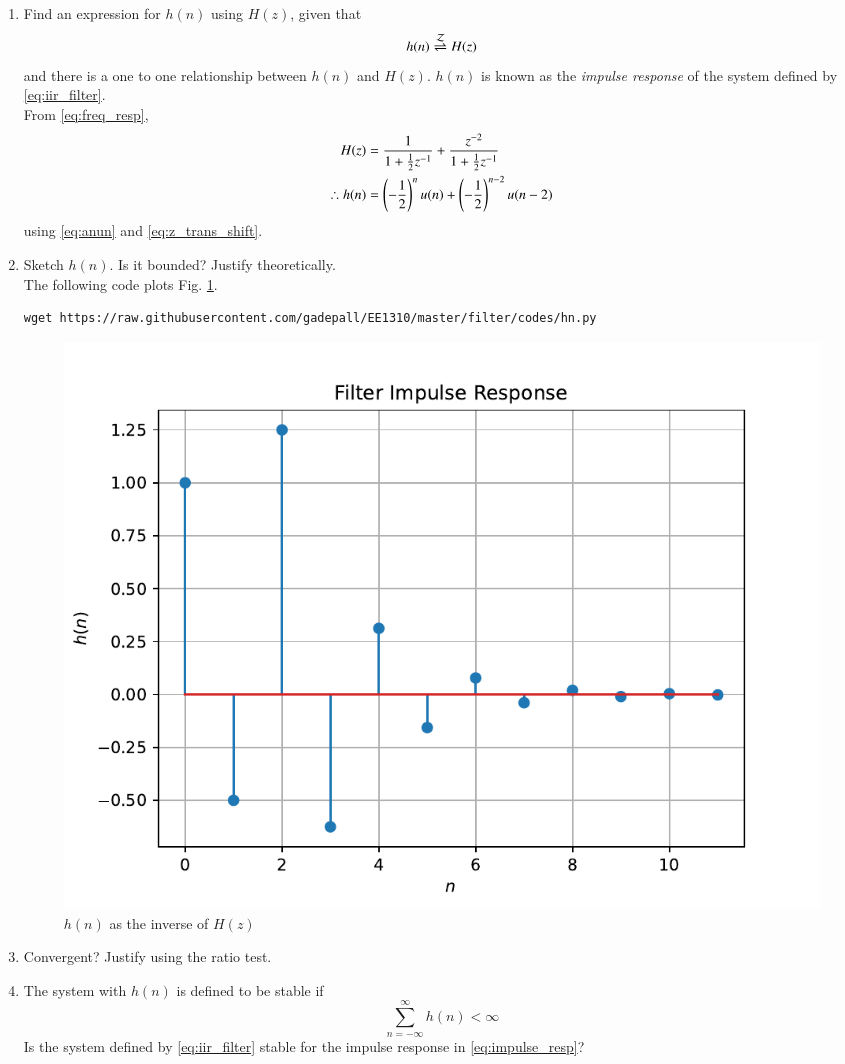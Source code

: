 \documentclass[journal,12pt,twocolumn]{IEEEtran}
\renewcommand\thesection{\arabic{section}}
\begin{document}
\begin{enumerate}[label=\thesection.\arabic*]
		\item \label{prob:impulse_resp}
		Find an expression for $h(n)$ using $H(z)$, given that 
		\begin{equation}
			\label{eq:impulse_resp}
			h(n) \overset{\mathcal{Z}}{ \rightleftharpoons} H(z)
		\end{equation}
		and there is a one to one relationship between $h(n)$ and $H(z)$. $h(n)$ is known as the {\em impulse response} of the
		system defined by \eqref{eq:iir_filter}.
		\\
		\solution From \eqref{eq:freq_resp},
		\begin{align}
			H(z) &= \frac{1}{1 + \frac{1}{2}z^{-1}} + \frac{ z^{-2}}{1 + \frac{1}{2}z^{-1}}
			\\
			\therefore h(n) &= \left(-\frac{1}{2}\right)^{n}u(n) + \left(-\frac{1}{2}\right)^{n-2}u(n-2)
		\end{align}
		using \eqref{eq:anun} and \eqref{eq:z_trans_shift}.
		\item Sketch $h(n)$. Is it bounded? Justify theoretically.
		\\
		\solution The following code plots Fig. \ref{fig:hn}.
		\begin{lstlisting}
wget https://raw.githubusercontent.com/gadepall/EE1310/master/filter/codes/hn.py
		\end{lstlisting}
		\begin{figure}[!ht]
			\centering
			\includegraphics[width=\columnwidth]{./figs/hn}
			\caption{$h(n)$ as the inverse of $H(z)$}
			\label{fig:hn}
		\end{figure}
		\item Convergent? Justify using the ratio test.
		\item The system with $h(n)$ is defined to be stable if
		\begin{equation}
			\sum_{n=-\infty}^{\infty}h(n) < \infty
		\end{equation}
		Is the system defined by \eqref{eq:iir_filter} stable for the impulse response in \eqref{eq:impulse_resp}?
		

\end{enumerate}
\end{document}
